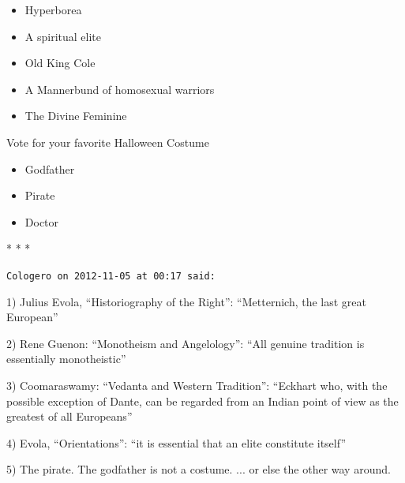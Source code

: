 \begin{itemize}
\item Hyperborea
\item A spiritual elite
\item Old King Cole
\item A Mannerbund of homosexual warriors
\item The Divine Feminine
\end{itemize}

Vote for your favorite Halloween Costume

\begin{itemize}
\item Godfather
\item Pirate
\item Doctor
\end{itemize}


\begin{center}* * *\end{center}

\begin{footnotesize}
\begin{sffamily}
\texttt{Cologero on 2012-11-05 at 00:17 said:}

1) Julius Evola, ``Historiography of the Right'': ``Metternich, the last great European''

2) Rene Guenon: ``Monotheism and Angelology'': ``All genuine tradition is essentially monotheistic''

3) Coomaraswamy: ``Vedanta and Western Tradition'': ``Eckhart who, with the possible exception of Dante, can be regarded from an Indian point of view as the greatest of all Europeans''

4) Evola, ``Orientations'': ``it is essential that an elite constitute itself''

5) The pirate. The godfather is not a costume. ... or else the other way around.


\hfill

\end{sffamily}
\end{footnotesize}

